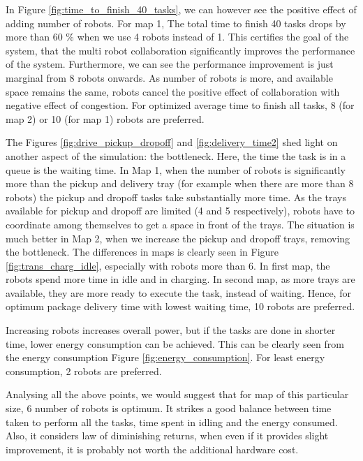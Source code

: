 \documentclass[journal]{IEEEtran}
\begin{document}
In Figure \ref{fig:time_to_finish_40_tasks}, we can however see the positive effect of adding number of robots. For map 1,  The total time to finish 40 tasks drops by more than 60 \% when we use 4 robots instead of 1. This certifies the goal of the system, that the multi robot collaboration significantly improves the performance of the system. Furthermore, we can see the performance improvement is just marginal from 8 robots onwards. As number of robots is more, and available space remains the same, robots cancel the positive effect of collaboration with negative effect of congestion. For optimized average time to finish all tasks, 8 (for map 2) or 10 (for map 1) robots are preferred.


The Figures \ref{fig:drive_pickup_dropoff} and \ref{fig:delivery_time2} shed light on another aspect of the simulation: the bottleneck. Here, the time the task is in a queue is the waiting time. In Map 1, when the number of robots is significantly more than the pickup and delivery tray (for example when there are more than 8 robots) the pickup and dropoff tasks take substantially more time. As the trays available for pickup and dropoff are limited (4 and 5 respectively), robots have to coordinate among themselves to get a space in front of the trays. The situation is much better in Map 2, when we increase the pickup and dropoff trays, removing the bottleneck. The differences in maps is clearly seen in Figure \ref{fig:trans_charg_idle}, especially with robots more than 6. In first map, the robots spend more time in idle and in charging. In second map, as more trays are available, they are more ready to execute the task, instead of waiting. Hence, for optimum package delivery time with lowest waiting time, 10 robots are preferred.

Increasing robots increases overall power, but if the tasks are done in shorter time, lower energy consumption can be achieved. This can be clearly seen from the energy consumption Figure \ref{fig:energy_consumption}. For least energy consumption, 2 robots are preferred.


Analysing all the above points, we would suggest that for map of this particular size, 6 number of robots is optimum. It strikes a good balance between time taken to perform all the tasks, time spent in idling and the energy consumed. Also, it considers law of diminishing returns, when even if it provides slight improvement, it is probably not worth the additional hardware cost.
\end{document}
